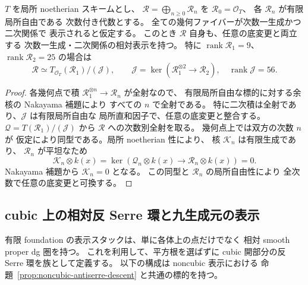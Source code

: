 \begin{lemma}[体上で二次なら全平坦族でも二次]
\label{lem:relative-quadratic-from-fibers}
$T$ を局所 noetherian スキームとし、
$\mathcal R=\bigoplus_{n\ge0}\mathcal R_n$ を
$\mathcal R_0=\mathcal O_T$、
各 $\mathcal R_n$ が有限局所自由である
次数付き代数とする。
全ての幾何ファイバーが次数一生成かつ二次関係で
表示されると仮定する。
このとき $\mathcal R$ 自身も、任意の底変更と両立する
次数一生成・二次関係の相対表示を持つ。
特に $\operatorname{rank}\mathcal R_1=9$、
$\operatorname{rank}\mathcal R_2=25$ の場合は
\[
 \mathcal R\simeq
 T_{\mathcal O_T}(\mathcal R_1)/(\mathcal J),
 \qquad
 \mathcal J=\ker(\mathcal R_1^{\otimes2}\to\mathcal R_2),
 \quad\operatorname{rank}\mathcal J=56.
 \tag{flat-Q}\label{eq:relative-quadratic-from-fibers}
\]
\end{lemma}
\begin{proof}
各幾何点で積
$\mathcal R_1^{\otimes n}\to\mathcal R_n$ が全射なので、
有限局所自由な標的に対する余核の Nakayama 補題により
すべての $n$ で全射である。
特に二次積は全射であり、$\mathcal J$ は有限局所自由な
局所直和因子で、任意の底変更と整合する。
$\mathcal Q=T(\mathcal R_1)/(\mathcal J)$ から
$\mathcal R$ への次数別全射を取る。
幾何点上では双方の次数 $n$ が
仮定により同型である。局所 noetherian 性により、
核 $\mathcal K_n$ は有限生成であり、
$\mathcal R_n$ が平坦なため
\[
 \mathcal K_n\otimes k(x)
 =\ker(\mathcal Q_n\otimes k(x)\to
                 \mathcal R_n\otimes k(x))=0.
\]
Nakayama 補題から $\mathcal K_n=0$ となる。
この同型と $\mathcal R_n$ の局所自由性により
全次数で任意の底変更と可換する。
\end{proof}

\subsection{cubic 上の相対反 Serre 環と九生成元の表示}
\label{subsec:cubic-relative-antiserre}

有限 foundation の表示スタックは、単に各体上の点だけでなく
相対 smooth proper dg 圏を持つ。
これを利用して、平方根を選ばずに
cubic 開部分の反 Serre 環を族として定義する。
以下の構成は noncubic 表示における
命題~\ref{prop:noncubic-antiserre-descent} と共通の標的を持つ。

